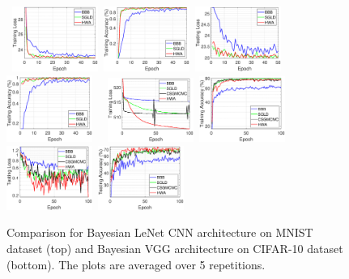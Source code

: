 \documentclass[tablecaption=bottom,wcp]{jmlr} %
\begin{document}
\begin{figure}[t]
\mbox{
\includegraphics[width=0.25\textwidth]{newfigs/MNIST_train_loss.eps}
\includegraphics[width=0.25\textwidth]{newfigs/MNIST_train_acc.eps}
\includegraphics[width=0.25\textwidth]{newfigs/MNIST_test_loss.eps}
\includegraphics[width=0.25\textwidth]{newfigs/MNIST_test_acc.eps}
}
\mbox{
\includegraphics[width=0.25\textwidth]{newfigs/CIFAR_train_loss.eps}
\includegraphics[width=0.25\textwidth]{newfigs/CIFAR_train_acc.eps}
\includegraphics[width=0.25\textwidth]{newfigs/CIFAR_test_loss.eps}
\includegraphics[width=0.25\textwidth]{newfigs/CIFAR_test_acc.eps}
}
\vspace{-0.2in}
 \caption{Comparison for Bayesian LeNet CNN architecture on MNIST dataset (top) and Bayesian VGG architecture on CIFAR-10 dataset (bottom). The plots are averaged over 5 repetitions.}
\label{fig:all}
\end{figure}
\end{document}
